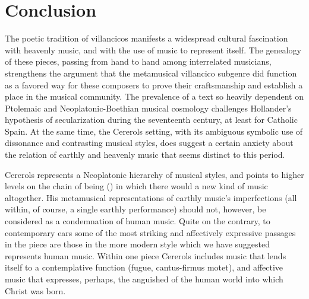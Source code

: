 
\section{Conclusion}

The poetic tradition of  villancicos manifests a
widespread cultural fascination with heavenly music, and with the use of music
to represent itself.
The genealogy of these pieces, passing from hand to hand among interrelated
musicians, strengthens the argument that the metamusical villancico subgenre did
function as a favored way for these composers to prove their craftsmanship and
establish a place in the musical community.
The prevalence of a text so heavily dependent on Ptolemaic and
Neoplatonic-Boethian musical cosmology challenges Hollander's hypothesis of
secularization during the seventeenth century, at least for Catholic Spain.
At the same time, the Cererols setting, with its ambiguous symbolic use of
dissonance and contrasting musical styles, does suggest a certain anxiety about
the relation of earthly and heavenly music that seems distinct to this period.

Cererols represents a Neoplatonic hierarchy of musical styles, and points to
higher levels on the chain of being () in which there
would a new kind of music altogether.
His metamusical representations of earthly music's imperfections (all within, of
course, a single earthly performance) should not, however, be considered as a
condemnation of human music.
Quite on the contrary, to contemporary ears some of the most striking and
affectively expressive passages in the piece are those in the more modern
style which we have suggested represents human music.  
Within one piece Cererols includes music that lends itself to a contemplative
function (fugue, cantus-firmus motet), and affective music that expresses,
perhaps, the anguished  of the human world into which Christ was
born.

